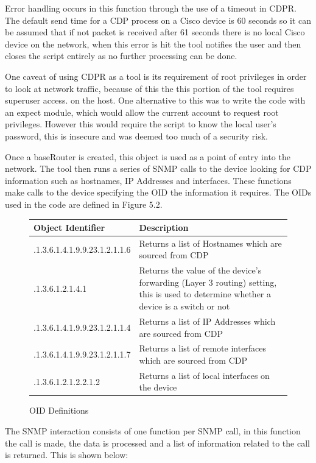 \documentclass[11pt]{report}
\begin{document}
Error handling occurs in this function through the use of a timeout in CDPR. The default send time for a CDP process on a Cisco device is 60 seconds so it can be assumed that if not packet is received after 61 seconds there is no local Cisco device on the network, when this error is hit the tool notifies the user and then closes the script entirely as no further processing can be done.

One caveat of using CDPR as a tool is its requirement of root privileges in order to look at network traffic, because of this the this portion of the tool requires superuser access. on the host. One alternative to this was to write the code with an expect module, which would allow the current account to request root privileges. However this would require the script to know the local user's password, this is insecure and was deemed too much of a security risk.

Once a baseRouter is created, this object is used as a point of entry into the network. The tool then runs a series of SNMP calls to the device looking for CDP information such as hostnames, IP Addresses and interfaces. These functions make calls to the device specifying the OID the information it requires. The OIDs used in the code are defined in Figure 5.2.

\begin{figure}[h!]
	\caption{OID Definitions}
	\centering
	\begin{tabular}{|l|p{11cm}|}
		\hline \textbf{Object Identifier} & \textbf{Description} \\ 
		\hline .1.3.6.1.4.1.9.9.23.1.2.1.1.6 & Returns a list of Hostnames which are sourced from CDP \\ 
		\hline .1.3.6.1.2.1.4.1 & Returns the value of the device's forwarding (Layer 3 routing) setting, this is used to determine whether a device is a switch or not \\ 
		\hline .1.3.6.1.4.1.9.9.23.1.2.1.1.4 & Returns a list of IP Addresses which are sourced from CDP \\ 
		\hline .1.3.6.1.4.1.9.9.23.1.2.1.1.7 & Returns a list of remote interfaces which are sourced from CDP \\
		\hline .1.3.6.1.2.1.2.2.1.2 & Returns a list of local interfaces on the device \\
		\hline 
	\end{tabular} 
\end{figure}

The SNMP interaction consists of one function per SNMP call, in this function the call is made, the data is processed and a list of information related to the call is returned. This is shown below:
\end{document}
